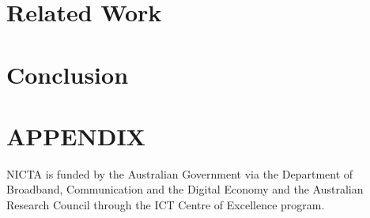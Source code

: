 \documentclass[prodmode,acmtecs]{acmsmall}
\begin{document}
%

\section{Related Work}
\label{sec:related_work}


\section{Conclusion}
\label{sec:conclusion}




\appendix
\section*{APPENDIX}


\begin{acks}
NICTA is funded by the Australian Government via 
the Department of Broadband, Communication and the Digital
Economy and the Australian Research Council through the ICT
Centre of Excellence program.
\end{acks}





%
%
%
\end{document}

